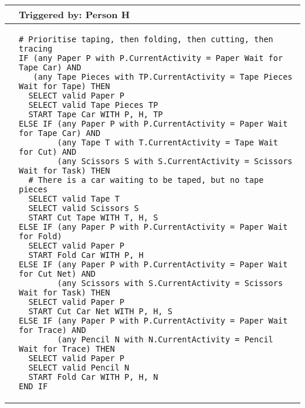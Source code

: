 \begin{longtable}{@{}>{\raggedright\arraybackslash}p{0.25cm}>{\raggedright\arraybackslash}p{13cm}@{}}
  \toprule
   & Triggered by: Person H\\ \midrule 
  &
\begin{lstlisting}[language=CMPseudo]
# Prioritise taping, then folding, then cutting, then tracing
IF (any Paper P with P.CurrentActivity = Paper Wait for Tape Car) AND
   (any Tape Pieces with TP.CurrentActivity = Tape Pieces Wait for Tape) THEN
  SELECT valid Paper P
  SELECT valid Tape Pieces TP
  START Tape Car WITH P, H, TP
ELSE IF (any Paper P with P.CurrentActivity = Paper Wait for Tape Car) AND
        (any Tape T with T.CurrentActivity = Tape Wait for Cut) AND
        (any Scissors S with S.CurrentActivity = Scissors Wait for Task) THEN
  # There is a car waiting to be taped, but no tape pieces
  SELECT valid Tape T
  SELECT valid Scissors S
  START Cut Tape WITH T, H, S
ELSE IF (any Paper P with P.CurrentActivity = Paper Wait for Fold)
  SELECT valid Paper P
  START Fold Car WITH P, H
ELSE IF (any Paper P with P.CurrentActivity = Paper Wait for Cut Net) AND
        (any Scissors with S.CurrentActivity = Scissors Wait for Task) THEN
  SELECT valid Paper P
  START Cut Car Net WITH P, H, S
ELSE IF (any Paper P with P.CurrentActivity = Paper Wait for Trace) AND
        (any Pencil N with N.CurrentActivity = Pencil Wait for Trace) THEN
  SELECT valid Paper P
  SELECT valid Pencil N
  START Fold Car WITH P, H, N
END IF
\end{lstlisting}
  \\ \bottomrule
  \end{longtable}